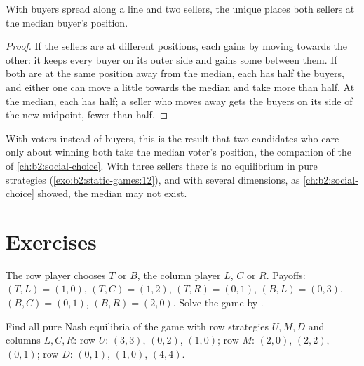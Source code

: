 \begin{proposition}\label{prop:b2:static-games:location}
With buyers spread along a line and two sellers, the unique  places both sellers at the median
buyer's position.
\end{proposition}

\begin{proof}
If the sellers are at different positions, each gains by moving towards the other: it keeps every buyer on its
outer side and gains some between them. If both are at the same position away from the median, each has half
the buyers, and either one can move a little towards the median and take more than half. At the median, each
has half; a seller who moves away gets the buyers on its side of the new midpoint, fewer than half.
\end{proof}

With voters instead of buyers, this is the result that two candidates who care only about winning both take
the median voter's position, the companion of the  of \cref{ch:b2:social-choice}. With
three sellers there is no equilibrium in pure strategies (\cref{exo:b2:static-games:12}), and with several
dimensions, as \cref{ch:b2:social-choice} showed, the median may not exist.

\section{Exercises}\label{sec:b2:static-games:exercises}

\begin{exercise}[$\star$]\label{exo:b2:static-games:1}
The row player chooses $T$ or $B$, the column player $L$, $C$ or $R$. Payoffs: $(T, L) = (1, 0)$, $(T, C) = (1, 2)$,
$(T, R) = (0, 1)$, $(B, L) = (0, 3)$, $(B, C) = (0, 1)$, $(B, R) = (2, 0)$. Solve the game by .
\end{exercise}

\begin{exercise}[$\star$]\label{exo:b2:static-games:2}
Find all pure Nash equilibria of the game with row strategies $U, M, D$ and columns $L, C, R$: row $U$: $(3, 3)$,
$(0, 2)$, $(1, 0)$; row $M$: $(2, 0)$, $(2, 2)$, $(0, 1)$; row $D$: $(0, 1)$, $(1, 0)$, $(4, 4)$.
\end{exercise}

